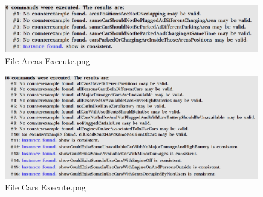 \begin{figure}[!htbp]
\centering
\includegraphics[width=\linewidth,keepaspectratio]{../Alloy/Exported/Images/Areas_Execute.png}
\caption{File Areas Execute.png}
\end{figure}
\FloatBarrier
\begin{figure}[!htbp]
\centering
\includegraphics[width=\linewidth,keepaspectratio]{../Alloy/Exported/Images/Cars_Execute.png}
\caption{File Cars Execute.png}
\end{figure}
\FloatBarrier